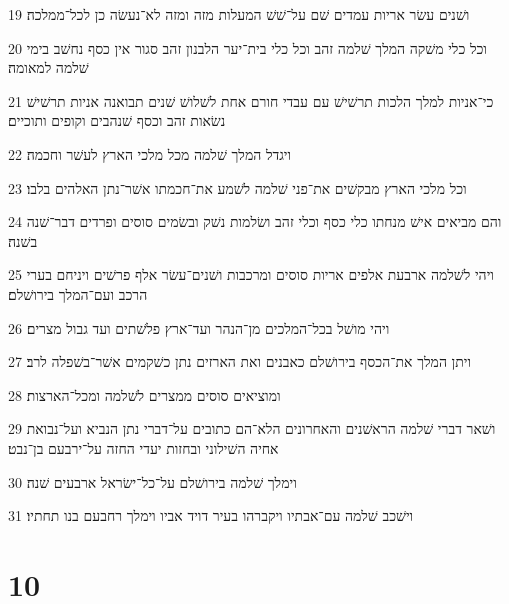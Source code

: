 \par 19 ושׁנים עשׂר אריות עמדים שׁם על־שׁשׁ המעלות מזה ומזה לא־נעשׂה כן לכל־ממלכה׃
\par 20 וכל כלי משׁקה המלך שׁלמה זהב וכל כלי בית־יער הלבנון זהב סגור אין כסף נחשׁב בימי שׁלמה למאומה׃
\par 21 כי־אניות למלך הלכות תרשׁישׁ עם עבדי חורם אחת לשׁלושׁ שׁנים תבואנה אניות תרשׁישׁ נשׂאות זהב וכסף שׁנהבים וקופים ותוכיים׃
\par 22 ויגדל המלך שׁלמה מכל מלכי הארץ לעשׁר וחכמה׃
\par 23 וכל מלכי הארץ מבקשׁים את־פני שׁלמה לשׁמע את־חכמתו אשׁר־נתן האלהים בלבו׃
\par 24 והם מביאים אישׁ מנחתו כלי כסף וכלי זהב ושׂלמות נשׁק ובשׂמים סוסים ופרדים דבר־שׁנה בשׁנה׃
\par 25 ויהי לשׁלמה ארבעת אלפים אריות סוסים ומרכבות ושׁנים־עשׂר אלף פרשׁים ויניחם בערי הרכב ועם־המלך בירושׁלם׃
\par 26 ויהי מושׁל בכל־המלכים מן־הנהר ועד־ארץ פלשׁתים ועד גבול מצרים׃
\par 27 ויתן המלך את־הכסף בירושׁלם כאבנים ואת הארזים נתן כשׁקמים אשׁר־בשׁפלה לרב׃
\par 28 ומוציאים סוסים ממצרים לשׁלמה ומכל־הארצות׃
\par 29 ושׁאר דברי שׁלמה הראשׁנים והאחרונים הלא־הם כתובים על־דברי נתן הנביא ועל־נבואת אחיה השׁילוני ובחזות יעדי החזה על־ירבעם בן־נבט׃
\par 30 וימלך שׁלמה בירושׁלם על־כל־ישׂראל ארבעים שׁנה׃
\par 31 וישׁכב שׁלמה עם־אבתיו ויקברהו בעיר דויד אביו וימלך רחבעם בנו תחתיו׃

\chapter{10}

